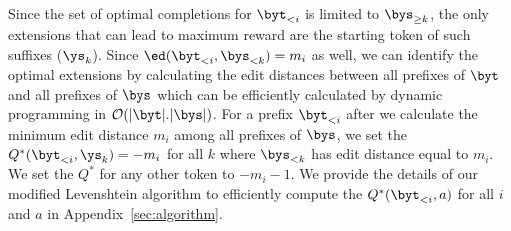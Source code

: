Since the set of optimal completions for $\byt_{<i}$ is limited to $\bys_{\geq k}$, the only extensions that can lead to maximum reward are the starting token of such suffixes ($\ys_k$). Since $\ed(\byt_{<i}, \bys_{<k}) = m_i$ as well, we can identify the optimal extensions by calculating the edit distances between all prefixes of $\byt$ and all prefixes of $\bys$ which can be efficiently calculated by dynamic programming in $\mathcal{O}(|\byt|.|\bys|)$. For a prefix $\byt_{<i}$ after we calculate the minimum edit distance $m_i$ among all prefixes of $\bys$, we set the $Q^*(\byt_{<i}, \ys_{k}) = -m_i $ for all $k$ where $\bys_{<k}$ has edit distance equal to $m_i$. We set the $Q^*$ for any other token to $-m_i-1$.
 We provide the details of our modified Levenshtein algorithm to efficiently compute the $Q^*(\byt_{<i}, a)$ for all $i$ and $a$ in Appendix~\ref{sec:algorithm}.
 
 
 
 
 
 
 
 
 
 
 
 

